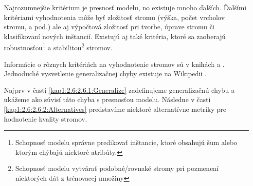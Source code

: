 Najrozumnejšie kritérium je presnosť modelu, no existuje mnoho ďalších. Ďalšími kritériami vyhodnotenia môže byť zložitosť stromu (výška, počet vrcholov stromu, a pod.) ale aj výpočtová zložitosť pri tvorbe, úprave stromu či klasifikovaní nových inštancií. Existujú aj také kritéria, ktoré sa zaoberajú robustnosťou\footnote{Schopnosť modelu správne predikovať inštancie, ktoré obsahujú šum alebo ktorým chýbajú niektoré atribúty.} a stabilitou\footnote{Schopnosť modelu vytvárať podobné/rovnaké stromy pri pozmenení niektorých dát z trénovacej množiny} stromov.

Informácie o rôznych kritériách na vyhodnotenie stromov sú v knihách \cite[s. 364]{kap1-DecisionTree} a \cite[s. 31]{kap1-DataMiningForMasses}. Jednoduché vysvetlenie generalizačnej chyby existuje na Wikipedii \cite{wiki-GeneralizationError}.

Najprv v časti \ref{kap1:2.6:2.6.1:Generalize} zadefinujeme generalizačnú chybu a ukážeme ako súvisí táto chyba s presnosťou modelu. Následne v časti \ref{kap1:2.6:2.6.2:Alternatives} predstavíme niektoré alternatívne metriky pre hodnotenie kvality stromov.

